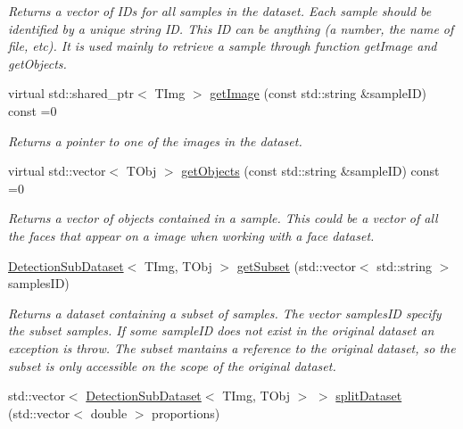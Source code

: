 \begin{DoxyCompactItemize}
\begin{DoxyCompactList}\small\item\em Returns a vector of I\+Ds for all samples in the dataset. Each sample should be identified by a unique string I\+D. This I\+D can be anything (a number, the name of file, etc). It is used mainly to retrieve a sample through function get\+Image and get\+Objects. \end{DoxyCompactList}\item 
virtual std\+::shared\+\_\+ptr$<$ T\+Img $>$ \hyperlink{class_vision_core_1_1_evaluation_1_1_detection_dataset_afaca4ebdf527646b545947fd4c2ec73c}{get\+Image} (const std\+::string \&sample\+I\+D) const  =0
\begin{DoxyCompactList}\small\item\em Returns a pointer to one of the images in the dataset. \end{DoxyCompactList}\item 
virtual std\+::vector$<$ T\+Obj $>$ \hyperlink{class_vision_core_1_1_evaluation_1_1_detection_dataset_a831ba73d31b15e00777727f98cf23669}{get\+Objects} (const std\+::string \&sample\+I\+D) const  =0
\begin{DoxyCompactList}\small\item\em Returns a vector of objects contained in a sample. This could be a vector of all the faces that appear on a image when working with a face dataset. \end{DoxyCompactList}\item 
\hypertarget{class_vision_core_1_1_evaluation_1_1_detection_dataset_ac21371d93712c4f10a2c44530f402a25}{}\hyperlink{class_vision_core_1_1_evaluation_1_1_detection_sub_dataset}{Detection\+Sub\+Dataset}$<$ T\+Img, T\+Obj $>$ \hyperlink{class_vision_core_1_1_evaluation_1_1_detection_dataset_ac21371d93712c4f10a2c44530f402a25}{get\+Subset} (std\+::vector$<$ std\+::string $>$ samples\+I\+D)\label{class_vision_core_1_1_evaluation_1_1_detection_dataset_ac21371d93712c4f10a2c44530f402a25}

\begin{DoxyCompactList}\small\item\em Returns a dataset containing a subset of samples. The vector samples\+I\+D specify the subset samples. If some sample\+I\+D does not exist in the original dataset an exception is throw. The subset mantains a reference to the original dataset, so the subset is only accessible on the scope of the original dataset. \end{DoxyCompactList}\item 
\hypertarget{class_vision_core_1_1_evaluation_1_1_detection_dataset_a4703b31fbe4c89baf44dfeeb7f2bb18d}{}std\+::vector$<$ \hyperlink{class_vision_core_1_1_evaluation_1_1_detection_sub_dataset}{Detection\+Sub\+Dataset}$<$ T\+Img, T\+Obj $>$ $>$ \hyperlink{class_vision_core_1_1_evaluation_1_1_detection_dataset_a4703b31fbe4c89baf44dfeeb7f2bb18d}{split\+Dataset} (std\+::vector$<$ double $>$ proportions)\label{class_vision_core_1_1_evaluation_1_1_detection_dataset_a4703b31fbe4c89baf44dfeeb7f2bb18d}


\end{DoxyCompactItemize}
